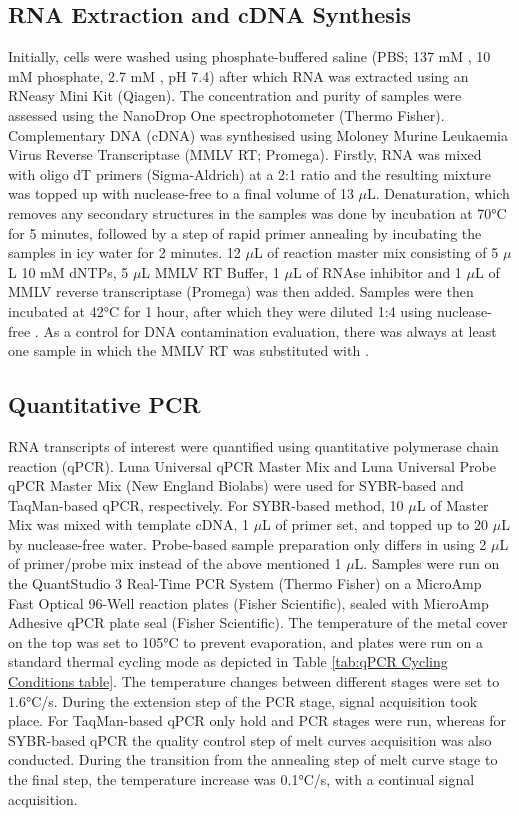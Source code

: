 \subsection{RNA Extraction and cDNA Synthesis} \label{subsec:RNA Extraction and cDNA Synthesis}
Initially, cells were washed using phosphate-buffered saline (PBS; 137 mM , 10 mM phosphate, 2.7 mM , pH 7.4) after which RNA was extracted using an RNeasy Mini Kit (Qiagen). The concentration and purity of samples were assessed using the NanoDrop One spectrophotometer (Thermo Fisher). Complementary DNA (cDNA) was synthesised using Moloney Murine Leukaemia Virus Reverse Transcriptase (MMLV RT; Promega). Firstly, RNA was mixed with oligo dT primers (Sigma-Aldrich) at a 2:1 ratio and the resulting mixture was topped up with nuclease-free  to a final volume of 13 \(\mu\)L. Denaturation, which removes any secondary structures in the samples was done by incubation at 70°C for 5 minutes, followed by a step of rapid primer annealing by incubating the samples in icy water for 2 minutes. 12 \(\mu\)L of reaction master mix consisting of 5 \(\mu\)L 10 mM dNTPs, 5 \(\mu\)L MMLV RT Buffer, 1 \(\mu\)L of RNAse inhibitor and 1 \(\mu\)L of MMLV reverse transcriptase (Promega) was then added. Samples were then incubated at 42°C for 1 hour, after which they were diluted 1:4 using nuclease-free . As a control for DNA contamination evaluation, there was always at least one sample in which the MMLV RT was substituted with .

\subsection{Quantitative PCR} \label{subsec:Quantitative PCR}
RNA transcripts of interest were quantified using quantitative polymerase chain reaction (qPCR). Luna Universal qPCR Master Mix and Luna Universal Probe qPCR Master Mix (New England Biolabs) were used for SYBR-based and TaqMan-based qPCR, respectively. For SYBR-based method, 10 \(\mu\)L of Master Mix was mixed with template cDNA, 1 \(\mu\)L of primer set, and topped up to 20 \(\mu\)L by nuclease-free water. Probe-based sample preparation only differs in using 2 \(\mu\)L of primer/probe mix instead of the above mentioned 1 \(\mu\)L. Samples were run on the QuantStudio 3 Real-Time PCR System (Thermo Fisher) on a MicroAmp Fast Optical 96-Well reaction plates (Fisher Scientific), sealed with MicroAmp Adhesive qPCR plate seal (Fisher Scientific). The temperature of the metal cover on the top was set to 105°C to prevent evaporation, and plates were run on a standard thermal cycling mode as depicted in Table \ref{tab:qPCR Cycling Conditions table}. The temperature changes between different stages were set to 1.6°C/s. During the extension step of the PCR stage, signal acquisition took place. For TaqMan-based qPCR only hold and PCR stages were run, whereas for SYBR-based qPCR the quality control step of melt curves acquisition was also conducted. During the transition from the annealing step of melt curve stage to the final step, the temperature increase was 0.1°C/s, with a continual signal acquisition.


